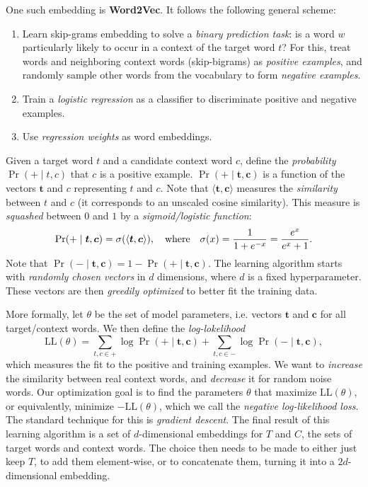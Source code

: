 One such embedding is \textbf{Word2Vec}.
It follows the following general scheme:
\begin{enumerate}
	\item Learn skip-grams embedding to solve a \emph{binary prediction task}: is a word \(w\) particularly likely to occur in a context of the target word \(t\)?
	For this, treat words and neighboring context words (skip-bigrams) as \emph{positive examples}, and randomly sample other words from the vocabulary to form \emph{negative examples}.
	\item Train a \emph{logistic regression} as a classifier to discriminate positive and negative examples.
	\item Use \emph{regression weights} as word embeddings.
\end{enumerate}

Given a target word \(t\) and a candidate context word \(c\), define the \emph{probability} \(\Pr(+ \mid t, c)\) that \(c\) is a positive example.
\(\Pr(+ \mid \bm{t}, \bm{c})\) is a function of the vectors \(\bm{t}\) and \(c\) representing \(t\) and \(c\).
Note that \(\langle \bm{t}, \bm{c} \rangle\) measures the \emph{similarity} between \(t\) and \(c\) (it corresponds to an unscaled cosine similarity).
This measure is \emph{squashed} between \(0\) and \(1\) by a \emph{sigmoid/logistic function}:
\[
\Pr(+ \mid \bm{t}, \bm{c}) = \sigma(\langle \bm{t}, \bm{c}\rangle), \quad \textnormal{where} \quad \sigma(x) = \frac{1}{1 + e^{-x}} = \frac{e^x}{e^x + 1}.
\]
Note that \(\Pr(- \mid \bm{t}, \bm{c}) = 1 - \Pr(+ \mid \bm{t}, \bm{c})\).
The learning algorithm starts with \emph{randomly chosen vectors} in \(d\) dimensions, where \(d\) is a fixed hyperparameter.
These vectors are then \emph{greedily optimized} to better fit the training data.

More formally, let \(\theta\) be the set of model parameters, i.e. vectors \(\bm{t}\) and \(\bm{c}\) for all target/context words.
We then define the \emph{log-lokelihood}
\[
\mathrm{LL}(\theta) = \sum_{t, c \in +} \log \Pr(+ \mid \bm{t}, \bm{c}) + \sum_{t, c \in -} \log \Pr(- \mid \bm{t}, \bm{c}),
\]
which measures the fit to the positive and training examples.
We want to \emph{increase} the similarity between real context words, and \emph{decrease} it for random noise words.
Our optimization goal is to find the parameters \(\theta\) that maximize \(\mathrm{LL}(\theta)\), or equivalently, minimize \(-\mathrm{LL}(\theta)\), which we call the \emph{negative log-likelihood loss}.
The standard technique for this is \emph{gradient descent}.
The final result of this learning algorithm is a set of \(d\)-dimensional embeddings for \(T\) and \(C\), the sets of target words and context words.
The choice then needs to be made to either just keep \(T\), to add them element-wise, or to concatenate them, turning it into a \(2d\)-dimensional embedding.

